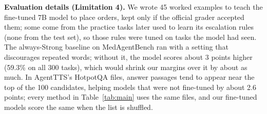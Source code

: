 \documentclass{article}
\begin{document}
\textbf{Evaluation details (Limitation 4).}\label{app:evaldetails} We wrote 45 worked examples to teach the fine-tuned 7B model to place orders, kept only if the official grader accepted them; some come from the practice tasks later used to learn its escalation rules (none from the test set), so those rules were tuned on tasks the model had seen. The always-Strong baseline on MedAgentBench ran with a setting that discourages repeated words; without it, the model scores about 3 points higher (59.3\% on all 300 tasks), which would shrink our margins over it by about as much. In AgentTTS's HotpotQA files, answer passages tend to appear near the top of the 100 candidates, helping models that were not fine-tuned by about 2.6 points; every method in Table~\ref{tab:main} uses the same files, and our fine-tuned models score the same when the list is shuffled.
\end{document}
